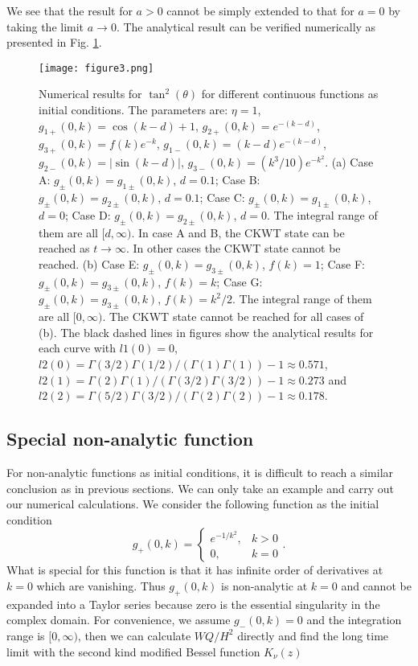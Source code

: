 \documentclass[english,aps,superscriptaddress,preprint]{revtex4-1}
\begin{document}
We see that the result for $a>0$ cannot be simply extended to that
for $a=0$ by taking the limit $a\rightarrow0$. The analytical result
can be verified numerically as presented in Fig. \ref{fig:continuous-func}.

\begin{figure}[h]
\caption{\label{fig:continuous-func}Numerical results for $\tan^{2}(\theta)$
for different continuous functions as initial conditions. The parameters
are: $\eta=1$, $g_{1+}(0,k)=\cos(k-d)+1$, $g_{2+}(0,k)=e^{-(k-d)}$,
$g_{3+}(0,k)=f(k)e^{-k}$, $g_{1-}(0,k)=(k-d)e^{-(k-d)}$, $g_{2-}(0,k)=|\sin(k-d)|$,
$g_{3-}(0,k)=(k^{3}/10)e^{-k^{2}}$. (a) Case A: $g_{\pm}(0,k)=g_{1\pm}(0,k)$,
$d=0.1$; Case B: $g_{\pm}(0,k)=g_{2\pm}(0,k)$, $d=0.1$; Case C:
$g_{\pm}(0,k)=g_{1\pm}(0,k)$, $d=0$; Case D: $g_{\pm}(0,k)=g_{2\pm}(0,k)$,
$d=0$. The integral range of them are all $[d,\infty)$. In case
A and B, the CKWT state can be reached as $t\rightarrow\infty$. In
other cases the CKWT state cannot be reached. (b) Case E: $g_{\pm}(0,k)=g_{3\pm}(0,k)$,
$f(k)=1$; Case F: $g_{\pm}(0,k)=g_{3\pm}(0,k)$, $f(k)=k$; Case
G: $g_{\pm}(0,k)=g_{3\pm}(0,k)$, $f(k)=k^{2}/2$. The integral range
of them are all $[0,\infty)$. The CKWT state cannot be reached for
all cases of (b). The black dashed lines in figures show the analytical
results for each curve with $l1(0)=0$, $l2(0)=\Gamma(3/2)\Gamma(1/2)/(\Gamma(1)\Gamma(1))-1\approx0.571$,
$l2(1)=\Gamma(2)\Gamma(1)/(\Gamma(3/2)\Gamma(3/2))-1\approx0.273$
and $l2(2)=\Gamma(5/2)\Gamma(3/2)/(\Gamma(2)\Gamma(2))-1\approx0.178$.}

\centering{}\texttt{[image: figure3.png]}
\end{figure}


\subsection{Special non-analytic function}

For non-analytic functions as initial conditions, it is difficult
to reach a similar conclusion as in previous sections. We can only
take an example and carry out our numerical calculations. We consider
the following function as the initial condition 
\begin{equation}
g_{+}(0,k)=\begin{cases}
e^{-1/k^{2}}, & k>0\\
0, & k=0
\end{cases}.
\end{equation}
What is special for this function is that it has infinite order of
derivatives at $k=0$ which are vanishing. Thus $g_{+}(0,k)$ is non-analytic
at $k=0$ and cannot be expanded into a Taylor series because zero
is the essential singularity in the complex domain. For convenience,
we assume $g_{-}(0,k)=0$ and the integration range is $[0,\infty)$,
then we can calculate $WQ/H^{2}$ directly and find the long time
limit with the second kind modified Bessel function $K_{\nu}(z)$ 
\end{document}
